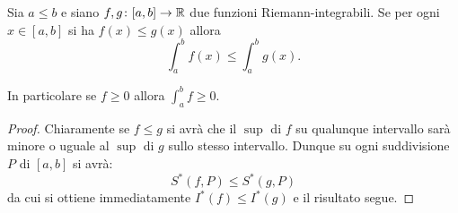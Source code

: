 \begin{theorem}%
\label{th:monotonia_integrale}%
\mymark{*}%
Sia $a\le b$ e siano
$f,g\colon [a,b]\to {\mathbb R}$ due funzioni Riemann-integrabili.
Se per ogni $x\in [a,b]$ si ha $f(x) \le g(x)$ allora
\[
  \int_a^b f(x) \le \int_a^b g(x).
\]

In particolare se $f\ge 0$ allora $\int_a^b f \ge 0$.
\end{theorem}
%
\begin{proof}
Chiaramente se $f \le g$ si avrà che il $\sup$ di $f$ su qualunque intervallo sarà minore o uguale al $\sup$ di $g$ sullo stesso intervallo. Dunque su ogni suddivisione $P$ di $[a,b]$ si avrà:
\[
  S^*(f,P) \le S^*(g,P)
\]
da cui si ottiene immediatamente $I^*(f) \le I^*(g)$ e il risultato segue.
\end{proof}

